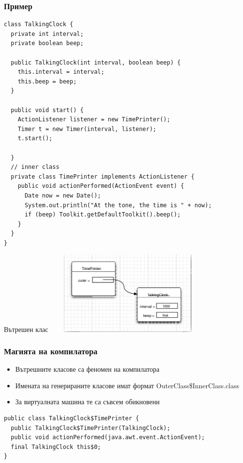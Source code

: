 \documentclass{beamer}
\begin{document}
\begin{frame}[fragile]
  \frametitle{Пример}
  \transdissolve
\begin{lstlisting}[basicstyle=\tiny]
class TalkingClock {
  private int interval;
  private boolean beep;

  public TalkingClock(int interval, boolean beep) {
    this.interval = interval;
    this.beep = beep;
  }
  
  public void start() {
    ActionListener listener = new TimePrinter();
    Timer t = new Timer(interval, listener);
    t.start();
  
  }
  // inner class
  private class TimePrinter implements ActionListener {
    public void actionPerformed(ActionEvent event) {
      Date now = new Date();
      System.out.println("At the tone, the time is " + now);
      if (beep) Toolkit.getDefaultToolkit().beep();
    }
  }
}
\end{lstlisting}
\end{frame}


\begin{frame}{Вътрешен клас}
  \transdissolve
  \includegraphics[width=320px,height=160px]{images/inner-class.png}
\end{frame}

\begin{frame}[fragile]
  \frametitle{Магията на компилатора}
  \transdissolve
\begin{itemize}
  \item Вътрешните класове са феномен на компилатора
  \item Имената на генерираните класове имат формат OuterClass\$InnerClass.class
  \item За виртуалната машина те са съвсем обикновени
\end{itemize}

\begin{lstlisting}
public class TalkingClock$TimePrinter {
  public TalkingClock$TimePrinter(TalkingClock);
  public void actionPerformed(java.awt.event.ActionEvent);
  final TalkingClock this$0;
}
\end{lstlisting}
\end{frame}
\end{document}
